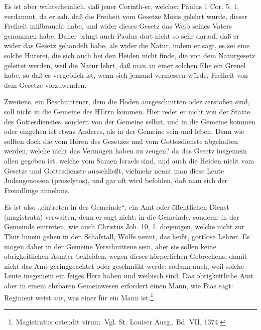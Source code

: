 Es ist aber wahrscheinlich, daß jener Corinth-er, welchen Paulus 1 Cor. 5, 1. verdammt, da er sah, daß die Freiheit vom Gesetze Mosis gelehrt wurde, dieser Freiheit mißbraucht habe, und wider dieses Gesetz das Weib seines Vaters genommen habe. Daher bringt auch Paulus dort nicht so sehr darauf, daß er wider das Gesetz gehandelt habe, als wider die Natur, indem er sagt, es sei eine solche Hurerei, die sich auch bei den Heiden nicht finde, die von dem Naturgesetz geleitet werden, weil die Natur lehrt, daß man an einer solchen Ehe ein Greuel habe, so daß es vergeblich ist, wenn sich jemand vermessen würde, Freiheit von dem Gesetze vorzuwenden.

Zweitens, ein Beschnittener, dem die Hoden ausgeschnitten oder zerstoßen sind, soll nicht in die Gemeine des HErrn kommen. Hier redet er nicht von der Stätte des Gottesdienstes, sondern von der Gemeine selbst, und in die Gemeine kommen oder eingehen ist etwas Anderes, als in der Gemeine sein und leben. Denn wie sollten doch die vom Hören des Gesetzes und vom Gottesdienste abgehalten werden, welche nicht
das Vermögen haben zu zeugen? da das Gesetz insgemein allen gegeben ist, welche vom Samen Israels sind, und auch die Heiden nicht vom Gesetze und Gottesdienste ausschließt, vielmehr nennt man diese Leute Judengenossen (proselytos), und gar oft wird befohlen, daß man sich der Fremdlinge annehme.

Es ist also „eintreten in der Gemeinde“, ein Amt oder öffentlichen Dienst (magistratu) verwalten, denn er sagt nicht: in die Gemeinde, sondern: in der Gemeinde eintreten, wie auch Christus Joh. 10, 1. diejenigen, welche nicht zur Thür hinein gehen in den Schafstall, Wölfe nennt, das heißt, gottlose Lehrer. Es mögen daher in der Gemeine Verschnittene sein, aber sie sollen keine obrigkeitlichen Aemter bekleiden, wegen dieses körperlichen Gebrechens, damit nicht das Amt geringgeachtet oder geschmäht werde; sodann auch, weil solche Leute insgemein ein feiges Herz haben und weibisch sind. Das obrigkeitliche Amt aber in einem ehrbaren Gemeinwesen erfordert einen Mann, wie Bias sagt: Regiment weist aus, was einer für ein Mann ist.\footnote{Magistratus ostendit virum. Vgl. St. Louiser Ausg., Bd. VII, 1374.}

